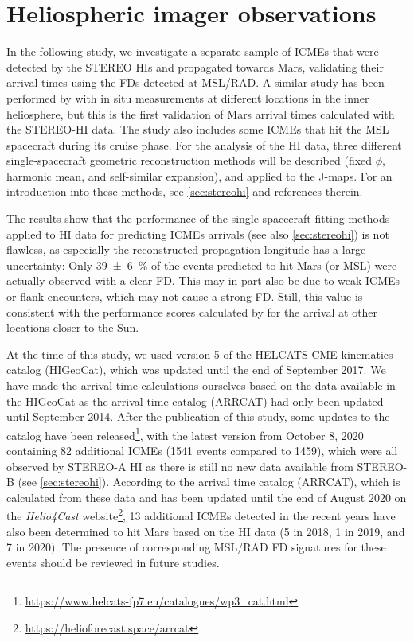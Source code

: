 

\section{Heliospheric imager observations}
In the following study, we investigate a separate sample of \acp{ICME} that were detected by the \ac{STEREO} \acp{HI} and propagated towards Mars, validating their arrival times using the \acp{FD} detected at \ac{MSL}/\ac{RAD}. A similar study has been performed by \citet{Moestl-2017-HelcatsHSO} with in situ measurements at different locations in the inner heliosphere, but this is the first validation of Mars arrival times calculated with the \ac{STEREO}-\ac{HI} data. The study also includes some \acp{ICME} that hit the \ac{MSL} spacecraft during its cruise phase.
For the analysis of the HI data, three different single-spacecraft geometric reconstruction methods will be described (fixed $\phi$, harmonic mean, and self-similar expansion), and applied to the J-maps. For an introduction into these methods, see \autoref{sec:stereohi} and references therein.

The results show that the performance of the single-spacecraft fitting methods applied to \ac{HI} data for predicting \acp{ICME} arrivals (see also \autoref{sec:stereohi}) is not flawless, as especially the reconstructed propagation longitude has a large uncertainty: Only \SI{39+-6}{\percent} of the events predicted to hit Mars (or \ac{MSL}) were actually observed with a clear \ac{FD}. This may in part also be due to weak \acp{ICME} or flank encounters, which may not cause a strong \ac{FD}. Still, this value is consistent with the performance scores calculated by \citet{Moestl-2017-HelcatsHSO} for the arrival at other locations closer to the Sun.

At the time of this study, we used version 5 of the \acs{HELCATS} CME kinematics catalog (HIGeoCat), which was updated until the end of September 2017. We have made the arrival time calculations ourselves based on the data available in the HIGeoCat as the arrival time catalog (ARRCAT) had only been updated until September 2014.
After the publication of this study, some updates to the catalog have been released\footnote{\url{https://www.helcats-fp7.eu/catalogues/wp3_cat.html}}, with the latest version from October 8, 2020 containing 82 additional \acp{ICME} (\num{1541} events compared to \num{1459}), which were all observed by \ac{STEREO}-A \ac{HI} as there is still no new data available from \ac{STEREO}-B (see \autoref{sec:stereohi}). According to the arrival time catalog (ARRCAT), which is calculated from these data and has been updated until the end of August 2020 on the \textit{Helio4Cast} website\footnote{\url{https://helioforecast.space/arrcat}}, 13 additional \acp{ICME} detected in the recent years have also been determined to hit Mars based on the \ac{HI} data (5 in 2018, 1 in 2019, and 7 in 2020). The presence of corresponding \ac{MSL}/\ac{RAD} \ac{FD} signatures for these events should be reviewed in future studies.

